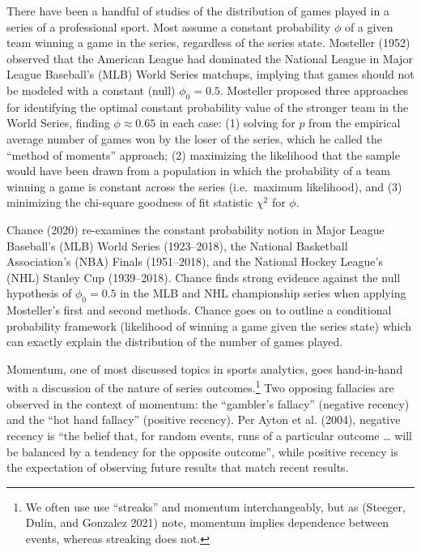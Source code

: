 \documentclass{article}
\begin{document}
There have been a handful of studies of the distribution of games played
in a series of a professional sport. Most assume a constant probability
\(\phi\) of a given team winning a game in the series, regardless of the
series state. Mosteller (1952) observed that the American League had
dominated the National League in Major League Baseball's (MLB) World
Series matchups, implying that games should not be modeled with a
constant (null) \(\phi_0 = 0.5\). Mosteller proposed three approaches
for identifying the optimal constant probability value of the stronger
team in the World Series, finding \(\phi \approx 0.65\) in each case:
(1) solving for \(p\) from the empirical average number of games won by
the loser of the series, which he called the ``method of moments''
approach; (2) maximizing the likelihood that the sample would have been
drawn from a population in which the probability of a team winning a
game is constant across the series (i.e.~maximum likelihood), and (3)
minimizing the chi-square goodness of fit statistic \(\chi^2\) for
\(\phi\).

Chance (2020) re-examines the constant probability notion in Major
League Baseball's (MLB) World Series (1923--2018), the National
Basketball Association's (NBA) Finals (1951--2018), and the National
Hockey League's (NHL) Stanley Cup (1939--2018). Chance finds strong
evidence against the null hypothesis of \(\phi_0 = 0.5\) in the MLB and
NHL championship series when applying Mosteller's first and second
methods. Chance goes on to outline a conditional probability framework
(likelihood of winning a game given the series state) which can exactly
explain the distribution of the number of games played.

Momentum, one of most discussed topics in sports analytics, goes
hand-in-hand with a discussion of the nature of series
outcomes.\footnote{We often use use ``streaks'' and momentum
  interchangeably, but as (Steeger, Dulin, and Gonzalez 2021) note,
  momentum implies dependence between events, whereas streaking does
  not.} Two opposing fallacies are observed in the context of momentum:
the ``gambler's fallacy'' (negative recency) and the ``hot hand
fallacy'' (positive recency). Per Ayton et al. (2004), negative recency
is ``the belief that, for random events, runs of a particular outcome
\ldots{} will be balanced by a tendency for the opposite outcome'',
while positive recency is the expectation of observing future results
that match recent results.
\end{document}
